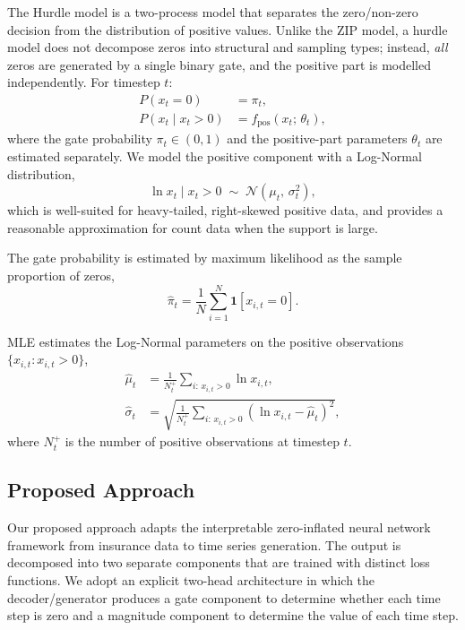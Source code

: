 \documentclass[make,article,submit,moreauthors]{Definitions/mdpi}
\begin{document}
The Hurdle model \cite{Cragg1971, ref20} is a two-process model that separates the zero/non-zero decision from the distribution of positive values. Unlike the ZIP model, a hurdle model does not decompose zeros into structural and sampling types; instead, \emph{all} zeros are generated by a single binary gate, and the positive part is modelled independently. For timestep $t$:
\begin{align}
  P(x_t = 0) &= \pi_t, \\
  P(x_t \mid x_t > 0) &= f_{\text{pos}}(x_t;\,\theta_t),
\end{align}
where the gate probability $\pi_t \in (0,1)$ and the positive-part parameters $\theta_t$ are estimated separately. We model the positive component with a Log-Normal distribution,
\begin{equation}
  \ln x_t \mid x_t > 0 \;\sim\; \mathcal{N}(\mu_t,\, \sigma_t^2),
\end{equation}
which is well-suited for heavy-tailed, right-skewed positive data, and provides a reasonable approximation for count data when the support is large.

The gate probability is estimated by maximum likelihood as the sample proportion of zeros,
\begin{equation}
  \hat{\pi}_t = \frac{1}{N}\sum_{i=1}^{N} \mathbf{1}[x_{i,t} = 0].
\end{equation}

MLE estimates the Log-Normal parameters on the positive observations $\{x_{i,t} : x_{i,t} > 0\}$,
\begin{align}
  \hat{\mu}_t &= \frac{1}{N_t^{+}}\sum_{i:\,x_{i,t}>0} \ln x_{i,t}, \\
  \hat{\sigma}_t &= \sqrt{\frac{1}{N_t^{+}}\sum_{i:\,x_{i,t}>0}
      (\ln x_{i,t} - \hat{\mu}_t)^2},
\end{align}
where $N_t^{+}$ is the number of positive observations at timestep $t$.




\subsection{Proposed Approach}
Our proposed approach adapts the interpretable zero-inflated neural network framework \cite{ref19} from insurance data to time series generation. The output is decomposed into two separate components that are trained with distinct loss functions. We adopt an explicit two-head architecture in which the decoder/generator produces a gate component to determine whether each time step is zero and a magnitude component to determine the value of each time step.
\end{document}
